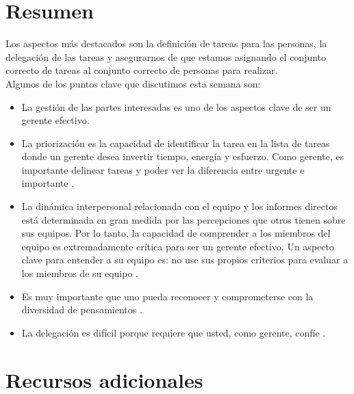 \documentclass[10pt]{book}
\begin{document}
\section{Resumen}
 Los aspectos más destacados son la definición de tareas para las personas, la delegación de las tareas y asegurarnos de que estamos asignando el conjunto correcto de tareas al conjunto correcto de personas para realizar.\\
Algunos de los puntos clave que discutimos esta semana son:
\begin{itemize}
\item La gestión de las partes interesadas es uno de los aspectos clave de ser un gerente efectivo.
\item La priorización es la capacidad de identificar la tarea en la lista de tareas donde un gerente desea invertir tiempo, energía y esfuerzo.
Como gerente, es importante delinear tareas y poder ver la diferencia entre urgente e importante .
\item La dinámica interpersonal relacionada con el equipo y los informes directos está determinada en gran medida por las percepciones que otros tienen sobre sus equipos. Por lo tanto, la capacidad de comprender a los miembros del equipo es extremadamente crítica para ser un gerente efectivo.
Un aspecto clave para entender a su equipo es: no use sus propios criterios para evaluar a los miembros de su equipo .
\item Es muy importante que uno pueda reconocer y comprometerse con la diversidad de pensamientos .
\item La delegación es difícil porque requiere que usted, como gerente, confíe . 
\end{itemize}   
\section{Recursos adicionales}
\end{document}
